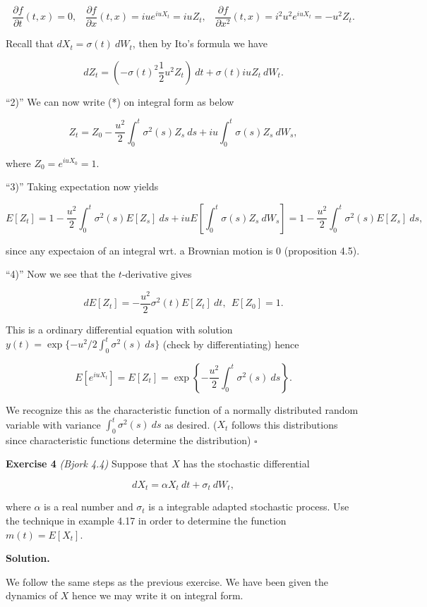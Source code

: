 \documentclass[
]{article}
\begin{document}
\[
\frac{\partial f}{\partial t}(t,x)=0,\hspace{10pt}\frac{\partial f}{\partial x}(t,x) =iue^{iuX_t}=iuZ_t,\hspace{10pt}\frac{\partial f}{\partial x^2}(t,x) =i^2u^2e^{iuX_t}=-u^2Z_t.
\]

Recall that \(dX_t=\sigma(t)\ dW_t\), then by Ito's formula we have

\[
dZ_t=\left(-\sigma(t)^2\frac{1}{2}u^2Z_t\right)\ dt+\sigma(t)iuZ_t\ dW_t.\tag{*}
\]

``2)'' We can now write (*) on integral form as below

\[
Z_t=Z_0-\frac{u^2}{2}\int_0^t\sigma^2(s)Z_s\ ds+iu\int_0^t\sigma (s)Z_s\ dW_s,
\]

where \(Z_0=e^{iuX_0}=1\).

``3)'' Taking expectation now yields

\[
E[Z_t]=1-\frac{u^2}{2}\int_0^t\sigma^2(s)E[Z_s]\ ds+iuE\left[\int_0^t \sigma(s)Z_s\ dW_s\right]=1-\frac{u^2}{2}\int_0^t\sigma^2(s)E[Z_s]\ ds,
\]

since any expectaion of an integral wrt. a Brownian motion is 0
(proposition 4.5).

``4)'' Now we see that the \(t\)-derivative gives

\[
dE[Z_t]=-\frac{u^2}{2}\sigma^2(t)E[Z_t]\ dt,\ \ E[Z_0]=1.
\]

This is a ordinary differential equation with solution
\(y(t)=\exp\{-u^2/2\int_0^t\sigma^2(s)\ ds\}\) (check by
differentiating) hence

\[
E[e^{iuX_t}]=E[Z_t]=\exp\left\{-\frac{u^2}{2}\int_0^t\sigma^2(s)\ ds\right\}.
\]

We recognize this as the characteristic function of a normally
distributed random variable with variance \(\int_0^t\sigma^2(s)\ ds\) as
desired. (\(X_t\) follows this distributions since characteristic
functions determine the distribution) \(\square\)

\textbf{Exercise 4} \emph{(Bjork 4.4)} Suppose that \(X\) has the
stochastic differential

\[
dX_t=\alpha X_t\ dt+\sigma_t\ dW_t,
\]

where \(\alpha\) is a real number and \(\sigma_t\) is a integrable
adapted stochastic process. Use the technique in example 4.17 in order
to determine the function \(m(t)=E[X_t]\).

\textbf{Solution.}

We follow the same steps as the previous exercise. We have been given
the dynamics of \(X\) hence we may write it on integral form.
\end{document}
